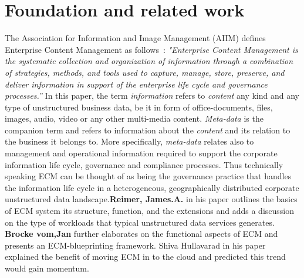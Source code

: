 \documentclass[EPiC]{easychair} %
\begin{document}
\section{Foundation and related work}
\label{sect:foundation}
    The Association for Information and Image Management (AIIM) defines Enterprise Content Management as follows~\cite{AIIM-2020}: \textit{"Enterprise Content Management is the systematic collection and organization of information through a combination of strategies, methods, and tools used to capture, manage, store, preserve, and deliver information in support of the enterprise life cycle and governance processes.”}  \noindent In this paper, the term \textit{information} refers to \textit{content} any kind and any type of unstructured business data, be it in form of office-documents, files, images, audio, video or any other multi-media content. \textit{Meta-data} is the companion term and refers to information about the \textit{content} and its relation to the business it belongs to. More specifically, \textit{meta-data} relates also to management and operational information required to support the corporate information life cycle, governance and compliance processes. Thus technically speaking ECM can be thought of as being the governance practice that handles the information life cycle in a heterogeneous, geographically distributed corporate unstructured data landscape.\textbf{Reimer, James.A.}\cite{reimer-james} in his paper outlines the basics of ECM system its structure, function, and the extensions and adds a discussion on the type of workloads that typical unstructured data services generates. \textbf{Brocke vom,Jan} \cite{vom-Brocke} further elaborates on the functional aspects of ECM and presents an ECM-blueprinting framework. Shiva Hullavarad  \cite{Shiva-Hullavarad} in his paper explained the benefit of moving ECM in to the cloud and predicted this trend would gain momentum.
    
    
\end{document}

